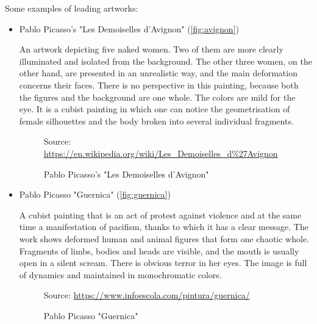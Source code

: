 \documentclass{report}
\begin{document}
Some examples of leading artworks:
    \begin{itemize}
    \item{Pablo Picasso's "Les Demoiselles d'Avignon" (\autoref{fig:avignon})}

An artwork depicting five naked women. Two of them are more clearly illuminated and isolated from the background. The other three women, on the other hand, are presented in an unrealistic way, and the main deformation concerns their faces. There is no perspective in this painting, because both the figures and the background are one whole. The colors are mild for the eye. It is a cubist painting in which one can notice the geometrisation of female silhouettes and the body broken into several individual fragments.

\begin{figure}[h]
\center
{} {Source: \url{https://en.wikipedia.org/wiki/Les_Demoiselles_d\%27Avignon}}
\caption{Pablo Picasso's "Les Demoiselles d'Avignon"}
\label{fig:avignon}
\end{figure}

    \item{Pablo Picasso "Guernica" (\autoref{fig:guernica})}
    
A cubist painting that is an act of protest against violence and at the same time a manifestation of pacifism, thanks to which it has a clear message. The work shows deformed human and animal figures that form one chaotic whole. Fragments of limbs, bodies and heads are visible, and the mouth is usually open in a silent scream. There is obvious terror in her eyes. The image is full of dynamics and maintained in monochromatic colors.

\begin{figure}[h]
\center
{} {Source: \url{https://www.infoescola.com/pintura/guernica/}}
\caption{Pablo Picasso  "Guernica"}
\label{fig:guernica}
\end{figure}

    \end{itemize}
\end{document}
